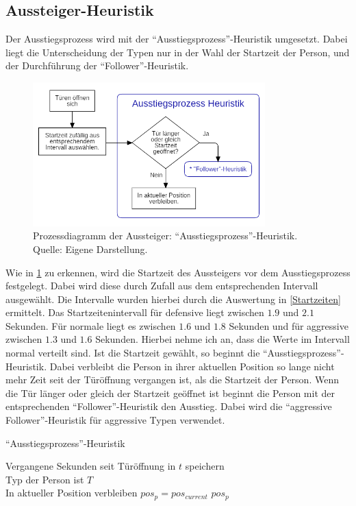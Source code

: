 \subsection{Aussteiger-Heuristik} \label{AM}
Der Ausstiegsprozess wird mit der "`Ausstiegsprozess"'-Heuristik umgesetzt. Dabei liegt die Unterscheidung der Typen nur in der Wahl der Startzeit der Person, und der Durchführung der "`Follower"'-Heuristik.
\begin{figure}[H]
	\centering
		\includegraphics[width=0.8\textwidth]{pictures/model/algorithm/alight/alight_process.png}
	\caption{Prozessdiagramm der Aussteiger: "`Ausstiegsprozess"'-Heuristik. Quelle: Eigene Darstellung.}
	\label{fig:AH}
\end{figure}
Wie in \figurename \ref{fig:AH} zu erkennen, wird die Startzeit des Aussteigers vor dem Ausstiegsprozess festgelegt. Dabei wird diese durch Zufall aus dem entsprechenden Intervall ausgewählt. Die Intervalle wurden hierbei durch die Auswertung in \ref{Startzeiten} ermittelt. Das Startzeitenintervall für defensive liegt zwischen $1.9$ und $2.1$ Sekunden. Für normale liegt es zwischen $1.6$ und $1.8$ Sekunden und für aggressive zwischen $1.3$ und $1.6$ Sekunden. Hierbei nehme ich an, dass die Werte im Intervall normal verteilt sind. Ist die Startzeit gewählt, so beginnt die "`Ausstiegsprozess"'-Heuristik. Dabei verbleibt die Person in ihrer aktuellen Position so lange nicht mehr Zeit seit der Türöffnung vergangen ist, als die Startzeit der Person. Wenn die Tür länger oder gleich der Startzeit geöffnet ist beginnt die Person mit der entsprechenden "`Follower"'-Heuristik den Ausstieg. Dabei wird die "`aggressive Follower"'-Heuristik für aggressive Typen verwendet. 
\clearpage
\begin{algorithm} [H]
	\caption{"`Ausstiegsprozess"'-Heuristik}

	\AlightHeuristic{} {
		Vergangene Sekunden seit Türöffnung in $t$ speichern\\
		Typ der Person ist $T$ \\
		 {
			In aktueller Position verbleiben $pos_{p} = pos_{current}$ 
		} 
		\Return $pos_p$
	}
\end{algorithm}

